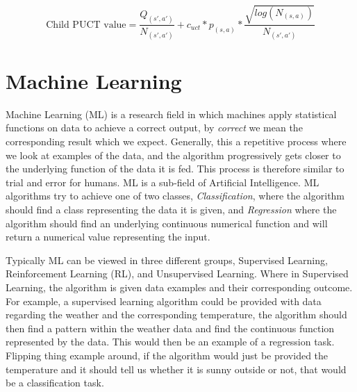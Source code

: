 \begin{equation} \label{PUCT_formula}
  \text{Child PUCT value} = \frac{Q_{(s',a')}}{N_{(s',a')}} + c_{uct} * p_{(s,a)} * \frac{\sqrt{log(N_{(s,a)})}}{N_{(s',a')}}
\end{equation}

\section{Machine Learning}

Machine Learning (ML) is a research field in which machines apply statistical functions on data to achieve a correct output, by \textit{correct} we mean the corresponding result which we expect. Generally, this a repetitive process where we look at examples of the data, and the algorithm progressively gets closer to the underlying function of the data it is fed. This process is therefore similar to trial and error for humans. ML is a sub-field of Artificial Intelligence. ML algorithms try to achieve one of two classes, \textit{Classification}, where the algorithm should find a class representing the data it is given, and \textit{Regression} where the algorithm should find an underlying continuous numerical function and will return a numerical value representing the input.

Typically ML can be viewed in three different groups, Supervised Learning, Reinforcement Learning (RL), and Unsupervised Learning. Where in Supervised Learning, the algorithm is given data examples and their corresponding outcome. For example, a supervised learning algorithm could be provided with data regarding the weather and the corresponding temperature, the algorithm should then find a pattern within the weather data and find the continuous function represented by the data. This would then be an example of a regression task. Flipping thing example around, if the algorithm would just be provided the temperature and it should tell us whether it is sunny outside or not, that would be a classification task.


